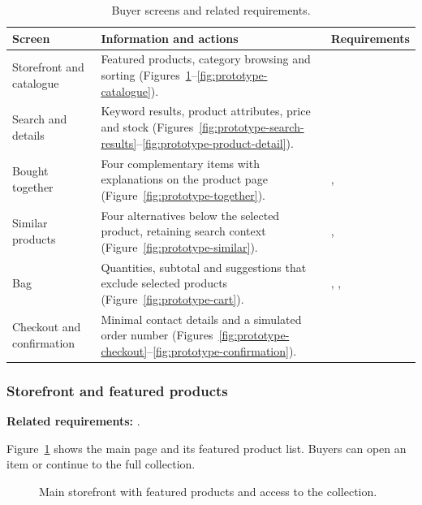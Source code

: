 \begin{table}[H]
  \centering
  \caption{Buyer screens and related requirements.}
  \label{tab:prototype-buyer}
  \tablestyle
  \begin{tabularx}{\textwidth}{|L{3.1cm}|>{\RaggedRight\arraybackslash}X|L{2.7cm}|}
    \hline
    \textbf{Screen} & \textbf{Information and actions} & \textbf{Requirements} \\\hline
    Storefront and catalogue & Featured products, category browsing and sorting
      (Figures~\ref{fig:prototype-storefront}--\ref{fig:prototype-catalogue}).
      &  \\\hline
    Search and details & Keyword results, product attributes, price and stock
      (Figures~\ref{fig:prototype-search-results}--\ref{fig:prototype-product-detail}).
      &  \\\hline
    Bought together & Four complementary items with explanations on the product
      page (Figure~\ref{fig:prototype-together}).
      & ,  \\\hline
    Similar products & Four alternatives below the selected product, retaining
      search context (Figure~\ref{fig:prototype-similar}).
      & ,  \\\hline
    Bag & Quantities, subtotal and suggestions that exclude selected products
      (Figure~\ref{fig:prototype-cart}).
      & , ,  \\\hline
    Checkout and confirmation & Minimal contact details and a simulated order
      number (Figures~\ref{fig:prototype-checkout}--\ref{fig:prototype-confirmation}).
      &  \\\hline
  \end{tabularx}
\end{table}

\begin{samepage}
\subsubsection{Storefront and featured products}
\label{sec:prototype-storefront-view}

\textbf{Related requirements:} .

Figure~\ref{fig:prototype-storefront} shows the main page and its featured
product list. Buyers can open an item or continue to the full collection.

\nopagebreak[4]
\begin{figure}[H]
  \centering
  \caption{Main storefront with featured products and access to the collection.}
  \label{fig:prototype-storefront}
\end{figure}
\end{samepage}


